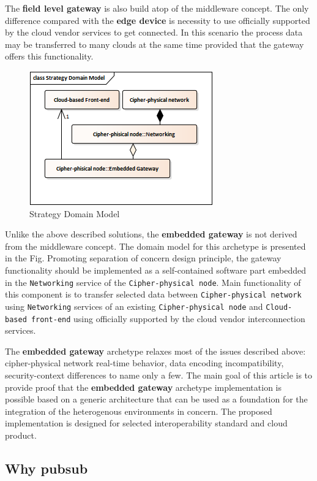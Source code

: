 \documentclass[
]{article}
\begin{document}
The \textbf{field level gateway} is also build atop of the middleware
concept. The only difference compared with the \textbf{edge device} is
necessity to use officially supported by the cloud vendor services to
get connected. In this scenario the process data may be transferred to
many clouds at the same time provided that the gateway offers this
functionality.

\begin{figure}
\centering
\includegraphics{../.Media/StrategyDomainModel.png}
\caption{Strategy Domain Model}
\end{figure}

Unlike the above described solutions, the \textbf{embedded gateway} is
not derived from the middleware concept. The domain model for this
archetype is presented in the Fig. Promoting separation of concern
design principle, the gateway functionality should be implemented as a
self-contained software part embedded in the \texttt{Networking} service
of the \texttt{Cipher-physical\ node}. Main functionality of this
component is to transfer selected data between
\texttt{Cipher-physical\ network} using \texttt{Networking} services of
an existing \texttt{Cipher-physical\ node} and
\texttt{Cloud-based\ front-end} using officially supported by the cloud
vendor interconnection services.

The \textbf{embedded gateway} archetype relaxes most of the issues
described above: cipher-physical network real-time behavior, data
encoding incompatibility, security-context differences to name only a
few. The main goal of this article is to provide proof that the
\textbf{embedded gateway} archetype implementation is possible based on
a generic architecture that can be used as a foundation for the
integration of the heterogenous environments in concern. The proposed
implementation is designed for selected interoperability standard and
cloud product.

\hypertarget{why-pubsub}{%
\subsection{Why pubsub}\label{why-pubsub}}
\end{document}
